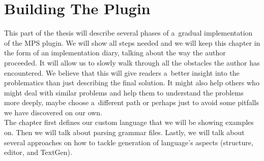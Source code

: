 \chapter{Building The Plugin}
\label{chap:importing_the_grammar}

This part of the thesis will describe several phases of a~gradual implementation of the MPS plugin.
We will show all steps needed and we will keep this chapter in the form of an implementation diary, talking about the way the author proceeded.
It will allow us to slowly walk through all the obstacles the author has encountered.
We believe that this will give readers a~better insight into the problematics than just describing the final solution.
It might also help others who might deal with similar problems and help them to understand the problems more deeply, maybe choose a~different path or perhaps just to avoid some pitfalls we have discovered on our own.
\\

The chapter first defines our custom language that we will be showing examples on.
Then we will talk about parsing grammar files.
Lastly, we will talk about several approaches on how to tackle generation of language's aspects (structure, editor, and TextGen).



\newpage



\newpage



\newpage



\newpage



\newpage

